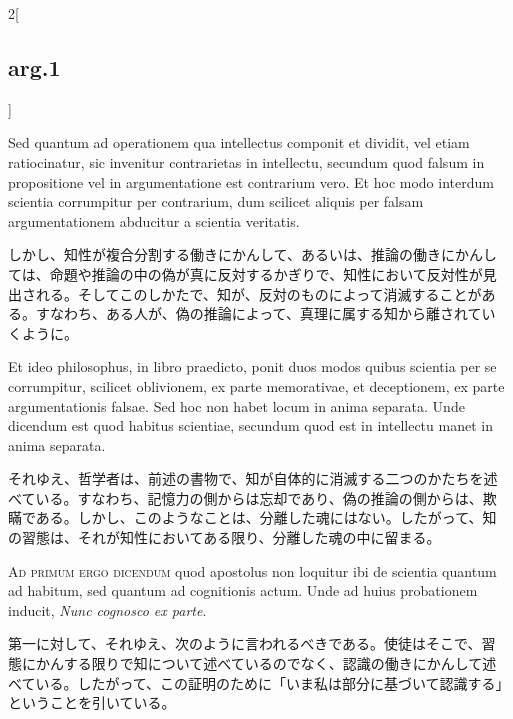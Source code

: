 \documentclass[paper=a4paper,fontsize=10pt,jafontsize=9pt,titlepage]{jlreq}
\begin{document}
\begin{paracol}{2}[\subsection{arg.1}]
\switchcolumn*

Sed quantum ad operationem qua intellectus componit et dividit, vel
etiam ratiocinatur, sic invenitur contrarietas in intellectu, secundum
quod falsum in propositione vel in argumentatione est contrarium
vero. Et hoc modo interdum scientia corrumpitur per contrarium, dum
scilicet aliquis per falsam argumentationem abducitur a scientia
veritatis.

\switchcolumn

しかし、知性が複合分割する働きにかんして、あるいは、推論の働きにかんし
ては、命題や推論の中の偽が真に反対するかぎりで、知性において反対性が見
出される。そしてこのしかたで、知が、反対のものによって消滅することがあ
る。すなわち、ある人が、偽の推論によって、真理に属する知から離されてい
くように。

\switchcolumn*

Et ideo philosophus, in libro praedicto, ponit duos modos quibus
scientia per se corrumpitur, scilicet oblivionem, ex parte
memorativae, et deceptionem, ex parte argumentationis falsae. Sed hoc
non habet locum in anima separata. Unde dicendum est quod habitus
scientiae, secundum quod est in intellectu manet in anima separata.

\switchcolumn

それゆえ、哲学者は、前述の書物で、知が自体的に消滅する二つのかたちを述
べている。すなわち、記憶力の側からは忘却であり、偽の推論の側からは、欺
瞞である。しかし、このようなことは、分離した魂にはない。したがって、知
の習態は、それが知性においてある限り、分離した魂の中に留まる。

\switchcolumn*[\subsection{ad.1}]

{\scshape Ad primum ergo dicendum} quod apostolus non loquitur ibi de
scientia quantum ad habitum, sed quantum ad cognitionis actum. Unde ad
huius probationem inducit, {\itshape Nunc cognosco ex parte}.

\switchcolumn

第一に対して、それゆえ、次のように言われるべきである。使徒はそこで、習
態にかんする限りで知について述べているのでなく、認識の働きにかんして述
べている。したがって、この証明のために「いま私は部分に基づいて認識する」
ということを引いている。

\switchcolumn*[\subsection{ad.2}]


\end{paracol}
\end{document}
